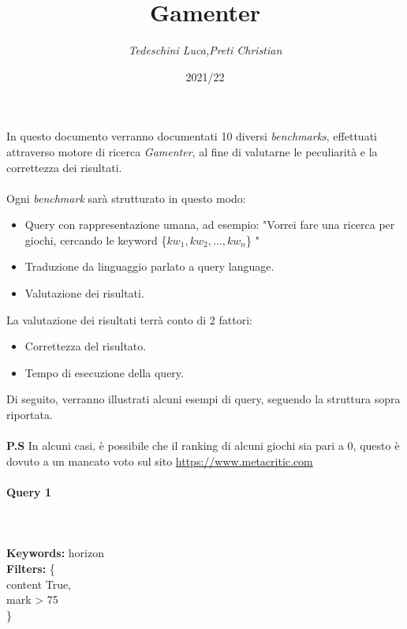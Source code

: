 \documentclass[12pt]{article}
\begin{document}
 \noindent
\title{\Huge \textbf{Gamenter}}
\author{\textit{Tedeschini Luca,Preti Christian}}
\date{2021/22}
\maketitle \noindent
In questo documento verranno documentati 10 diversi \textit{benchmarks}, effettuati attraverso motore di ricerca \textit{Gamenter}, al fine di valutarne le peculiarità e la correttezza dei risultati.
\\ \\
Ogni \textit{benchmark} sarà strutturato in questo modo:

\begin{itemize}
	\item Query con rappresentazione umana, ad esempio: "Vorrei fare una ricerca per giochi, cercando le keyword \{$kw_1, kw_2, ..., kw_n$\} "
	
	\item Traduzione da linguaggio parlato a query language.

	\item Valutazione dei risultati.

\end{itemize}

\noindent La valutazione dei risultati terrà conto di 2 fattori:

\begin{itemize}
	\item Correttezza del risultato.
	\item Tempo di esecuzione della query.
\end{itemize} 

\noindent Di seguito, verranno illustrati alcuni esempi di query, seguendo la struttura sopra riportata. \\ \\
\textbf{P.S} In alcuni casi, è possibile che il ranking di alcuni giochi sia pari a 0, questo è dovuto a un mancato voto sul sito \url{https://www.metacritic.com}
\pagebreak

\paragraph{\LARGE{Query 1}} ~ \\ \\

\noindent \textbf{Keywords: } horizon \\
\textbf{Filters: } \{ \\ 
	\indent content True, \\
	\indent mark > 75 \\
\} \\\\
 	
\end{document}
